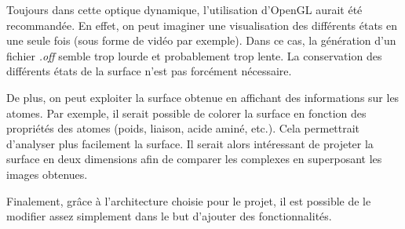 Toujours dans cette optique dynamique, l'utilisation d'OpenGL aurait été recommandée.
En effet, on peut imaginer une visualisation des différents états en une seule fois (sous
forme de vidéo par exemple). Dans ce cas, la génération d'un fichier \textit{.off}
semble trop lourde et probablement trop lente. La conservation des différents états de
la surface n'est pas forcément nécessaire.

De plus, on peut exploiter la surface obtenue en affichant des informations sur
les atomes. Par exemple, il serait possible de colorer la surface en fonction des propriétés
des atomes (poids, liaison, acide aminé, etc.). Cela permettrait d'analyser plus facilement
la surface. Il serait alors intéressant de projeter la surface en deux dimensions afin
de comparer les complexes en superposant les images obtenues.

Finalement, grâce à l'architecture choisie pour le projet, il est possible de le
modifier assez simplement dans le but d'ajouter des fonctionnalités.
